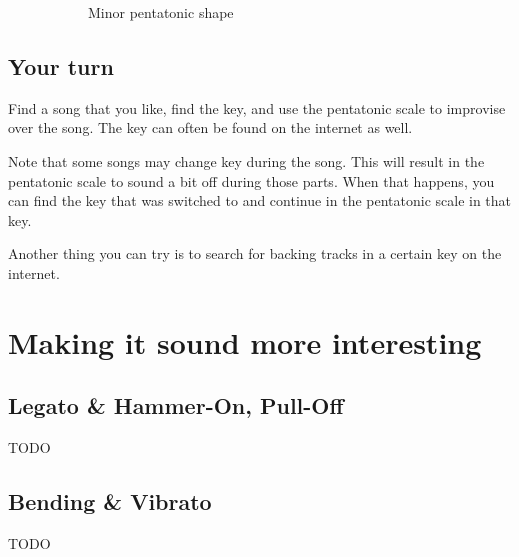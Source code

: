 \begin{figure}[h]
\begin{subfigure}[b]{0.45\textwidth}
		\caption{Minor pentatonic shape}
		\label{fig:guitar_minor_pentatonic_shape}
	\end{subfigure}
	\caption{}
	\label{fig:guitar_major_minor_pentatonic_shapes}
\end{figure}

\subsection{Your turn}

Find a song that you like, find the key, and use the pentatonic scale to improvise over the song. The key can often be found on the internet as well.

Note that some songs may change key during the song. This will result in the pentatonic scale to sound a bit off during those parts. When that happens, you can find the key that was switched to and continue in the pentatonic scale in that key.

Another thing you can try is to search for backing tracks in a certain key on the internet.

\newpage

\section{Making it sound more interesting}

\subsection{Legato \& Hammer-On, Pull-Off}
TODO

\subsection{Bending \& Vibrato}
TODO
